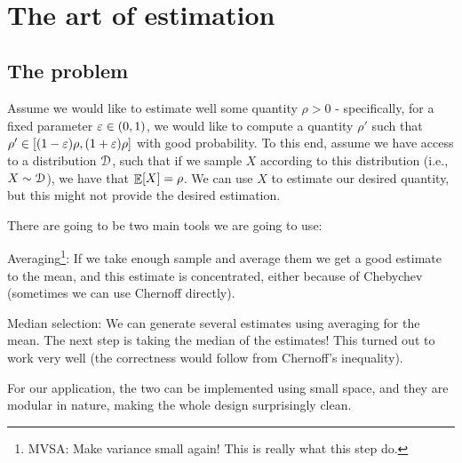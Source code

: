 %






\noindent%
\ChapterPrefix{}%
\ChapterGen{}

~


\bigskip%


\section{The art of estimation}

\subsection{The problem}
Assume we would like to estimate well some quantity $\rho > 0$ -
specifically, for a fixed parameter ${\varepsilon} \in (0,1)$, we would like to
compute a quantity $\rho'$ such that
$\rho' \in [(1-{\varepsilon})\rho, (1+{\varepsilon})\rho]$ with good probability.  To
this end, assume we have access to a distribution $\EuScript{D}$,
such that if we sample $X$ according to this distribution (i.e.,
$X \sim \EuScript{D}$), we have that $\mathop{\mathbb{E}}\!\left[ {X} \right] = \rho$. We can use $X$
to estimate our desired quantity, but this might not provide the
desired estimation.

There are going to be two main tools we are going to use:
\begin{compactenumI}
    \smallskip%
    \item \textsf{Averaging}\footnote{MVSA: Make variance small again!
       This is really what this step do.}: If we take enough sample and
    average them we get a good estimate to the mean, and this estimate is
    concentrated, either because of Chebychev (sometimes we can use
    Chernoff directly).

    \smallskip
    \item \textsf{Median selection}: We can generate several estimates
    using averaging for the mean. The next step is taking the median of
    the estimates! This turned out to work very well (the correctness
    would follow from Chernoff's inequality).
    
\end{compactenumI}
\smallskip%
For our application, the two can be implemented using small space, and
they are modular in nature, making the whole design surprisingly clean.

